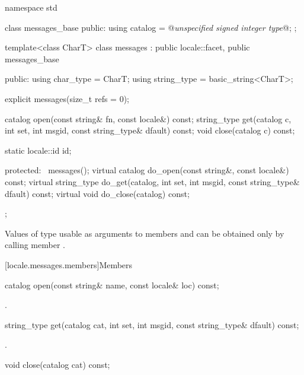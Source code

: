 %
\begin{codeblock}
namespace std {
  class messages_base {
  public:
    using catalog = @\textit{unspecified signed integer type}@;
  };

  template<class CharT>
    class messages : public locale::facet, public messages_base {
    public:
      using char_type   = CharT;
      using string_type = basic_string<CharT>;

      explicit messages(size_t refs = 0);

      catalog open(const string& fn, const locale&) const;
      string_type get(catalog c, int set, int msgid,
                      const string_type& dfault) const;
      void close(catalog c) const;

      static locale::id id;

    protected:
      ~messages();
      virtual catalog do_open(const string&, const locale&) const;
      virtual string_type do_get(catalog, int set, int msgid,
                                 const string_type& dfault) const;
      virtual void do_close(catalog) const;
    };
}
\end{codeblock}

\pnum
Values of type 
usable as arguments to members  and 
can be obtained only by calling member .

[locale.messages.members]{Members}

%
\begin{itemdecl}
catalog open(const string& name, const locale& loc) const;
\end{itemdecl}

\begin{itemdescr}
\pnum
\returns
{}.
\end{itemdescr}

%
\begin{itemdecl}
string_type get(catalog cat, int set, int msgid, const string_type& dfault) const;
\end{itemdecl}

\begin{itemdescr}
\pnum
\returns
{}.
\end{itemdescr}

%
\begin{itemdecl}
void close(catalog cat) const;
\end{itemdecl}

